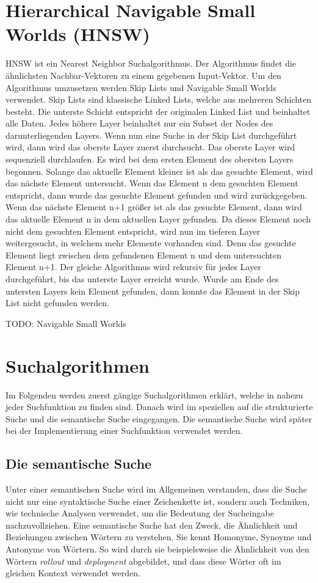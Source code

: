 \section{Hierarchical Navigable Small Worlds (HNSW)}
HNSW ist ein Nearest Neighbor Suchalgorithmus.
Der Algorithmus findet die ähnlichsten Nachbar-Vektoren zu einem gegebenen Input-Vektor.
Um den Algorithmus umzusetzen werden Skip Lists und Navigable Small Worlds verwendet.
Skip Lists sind klassische Linked Lists, welche aus mehreren Schichten besteht.
Die unterste Schicht entspricht der originalen Linked List und beinhaltet alle Daten.
Jedes höhere Layer beinhaltet nur ein Subset der Nodes des darunterliegenden Layers.
Wenn nun eine Suche in der Skip List durchgeführt wird, dann wird das oberste Layer zuerst durchsucht.
Das oberste Layer wird sequenziell durchlaufen.
Es wird bei dem ersten Element des obersten Layers begonnen.
Solange das aktuelle Element kleiner ist als das gesuchte Element, wird das nächste Element untersucht.
Wenn das Element n dem gesuchten Element entspricht, dann wurde das gesuchte Element gefunden und wird zurückgegeben.
Wenn das nächste Element n+1 größer ist als das gesuchte Element, dann wird das aktuelle Element n in dem aktuellen Layer gefunden.
Da dieses Element noch nicht dem gesuchten Element entspricht, wird nun im tieferen Layer weitergesucht, in welchem mehr Elemente vorhanden sind.
Denn das gesuchte Element liegt zwischen dem gefundenen Element n und dem untersuchten Element n+1.
Der gleiche Algorithmus wird rekursiv für jedes Layer durchgeführt, bis das unterste Layer erreicht wurde.
Wurde am Ende des untersten Layers kein Element gefunden, dann konnte das Element in der Skip List nicht gefunden werden.\cite{10.5555/93711}

TODO: Navigable Small Worlds\cite{Malkov_Yashunin_2020}\\ 

\section{Suchalgorithmen}
Im Folgenden werden zuerst gängige Suchalgorithmen erklärt, welche in nahezu jeder Suchfunktion zu finden sind.
Danach wird im speziellen auf die strukturierte Suche und die semantische Suche eingegangen.
Die semantische Suche wird später bei der Implementierung einer Suchfunktion verwendet werden.

\subsection{Die semantische Suche}
Unter einer semantischen Suche wird im Allgemeinen verstanden, dass die Suche nicht nur eine syntaktische Suche einer Zeichenkette ist, sondern auch Techniken, wie technische Analysen verwendet, um die Bedeutung der Sucheingabe nachzuvollziehen.\cite{Dengel_2012}
Eine semantische Suche hat den Zweck, die Ähnlichkeit und Beziehungen zwischen Wörtern zu verstehen.
Sie kennt Homonyme, Synoyme und Antonyme von Wörtern.  
So wird durch sie beispielsweise die Ähnlichkeit von den Wörtern \textit{rollout} und \textit{deployment} abgebildet, und dass diese Wörter oft im gleichen Kontext verwendet werden.\\

